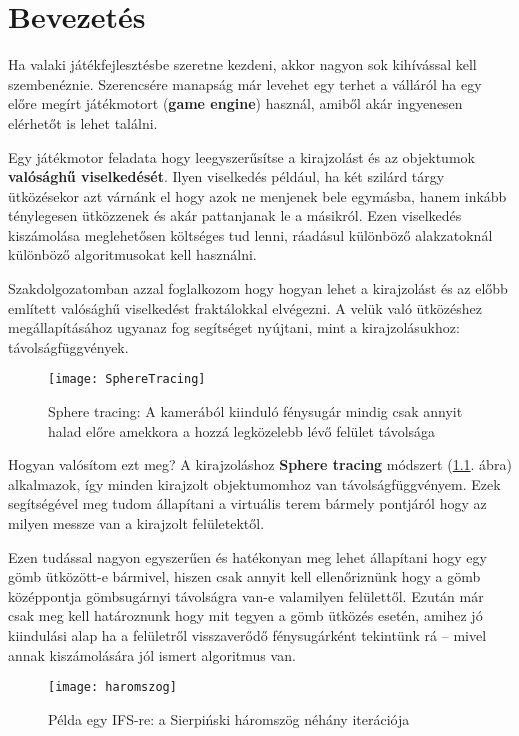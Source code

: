 \chapter{Bevezetés} %
\label{ch:intro}

Ha valaki játékfejlesztésbe szeretne kezdeni, akkor nagyon sok kihívással kell szembenéznie. Szerencsére manapság már levehet egy terhet a válláról ha egy előre megírt játékmotort (\textbf{game engine}) használ, amiből akár ingyenesen elérhetőt is lehet találni.

Egy játékmotor feladata hogy leegyszerűsítse a kirajzolást és az objektumok \textbf{valósághű viselkedését}. Ilyen viselkedés például, ha két szilárd tárgy ütközésekor azt várnánk el hogy azok ne menjenek bele egymásba, hanem inkább ténylegesen ütközzenek és akár pattanjanak le a másikról. Ezen viselkedés kiszámolása meglehetősen költséges tud lenni, ráadásul különböző alakzatoknál különböző algoritmusokat kell használni.

Szakdolgozatomban azzal foglalkozom hogy hogyan lehet a kirajzolást és az előbb említett valósághű viselkedést fraktálokkal elvégezni. A velük való ütközéshez megállapításához ugyanaz fog segítséget nyújtani, mint a kirajzolásukhoz: távolságfüggvények. 


\begin{figure}[H]
	\centering
	\texttt{[image: SphereTracing]}
	\caption{Sphere tracing: A kamerából kiinduló fénysugár mindig csak annyit halad előre amekkora a hozzá legközelebb lévő felület távolsága \cite{Raymarch94:online}}
	\label{fig:SphereTracing}
\end{figure}

Hogyan valósítom ezt meg? A kirajzoláshoz \textbf{Sphere tracing} módszert (\ref{fig:SphereTracing}. ábra) alkalmazok, így minden kirajzolt objektumomhoz van távolságfüggvényem. Ezek segítségével meg tudom állapítani a virtuális terem bármely pontjáról hogy az milyen messze van a kirajzolt felületektől. 

Ezen tudással nagyon egyszerűen és hatékonyan meg lehet állapítani hogy egy gömb ütközött-e bármivel, hiszen csak annyit kell ellenőriznünk hogy a gömb középpontja gömbsugárnyi távolságra van-e valamilyen felülettől. Ezután már csak meg kell határoznunk hogy mit tegyen a gömb ütközés esetén, amihez jó kiindulási alap ha a felületről visszaverődő fénysugárként tekintünk rá -- mivel annak kiszámolására jól ismert algoritmus van.

\begin{figure}[H]
	\centering
	\texttt{[image: haromszog]}
	\caption{Példa egy IFS-re: a Sierpiński háromszög néhány iterációja \cite{Sierpins37:online}}
	\label{fig:Ifs}
\end{figure}

